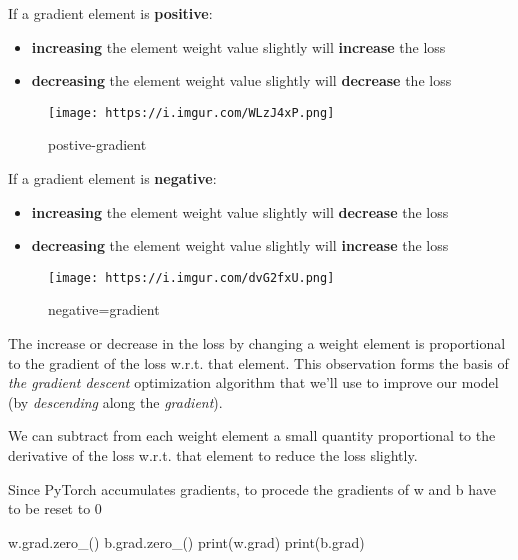 \documentclass[
  letterpaper,
  DIV=11,
  numbers=noendperiod]{scrartcl}
\newenvironment{Shaded}{\begin{snugshade}}{\end{snugshade}}
\newcommand{\BuiltInTok}[1]{\textcolor[rgb]{0.00,0.23,0.31}{#1}}
\newcommand{\NormalTok}[1]{\textcolor[rgb]{0.00,0.23,0.31}{#1}}
\providecommand{\tightlist}{%
  \setlength{\itemsep}{0pt}\setlength{\parskip}{0pt}}\usepackage{longtable,booktabs,array}
\begin{document}
If a gradient element is \textbf{positive}:

\begin{itemize}
\tightlist
\item
  \textbf{increasing} the element weight value slightly will
  \textbf{increase} the loss
\item
  \textbf{decreasing} the element weight value slightly will
  \textbf{decrease} the loss
\end{itemize}

\begin{figure}

{\centering \texttt{[image: https://i.imgur.com/WLzJ4xP.png]}

}

\caption{postive-gradient}

\end{figure}

If a gradient element is \textbf{negative}:

\begin{itemize}
\tightlist
\item
  \textbf{increasing} the element weight value slightly will
  \textbf{decrease} the loss
\item
  \textbf{decreasing} the element weight value slightly will
  \textbf{increase} the loss
\end{itemize}

\begin{figure}

{\centering \texttt{[image: https://i.imgur.com/dvG2fxU.png]}

}

\caption{negative=gradient}

\end{figure}

The increase or decrease in the loss by changing a weight element is
proportional to the gradient of the loss w.r.t. that element. This
observation forms the basis of \emph{the gradient descent} optimization
algorithm that we'll use to improve our model (by \emph{descending}
along the \emph{gradient}).

We can subtract from each weight element a small quantity proportional
to the derivative of the loss w.r.t. that element to reduce the loss
slightly.

Since PyTorch accumulates gradients, to procede the gradients of w and b
have to be reset to 0

\begin{Shaded}
\begin{Highlighting}[]
\NormalTok{w.grad.zero\_()}
\NormalTok{b.grad.zero\_()}
\BuiltInTok{print}\NormalTok{(w.grad)}
\BuiltInTok{print}\NormalTok{(b.grad)}
\end{Highlighting}
\end{Shaded}
\end{document}
